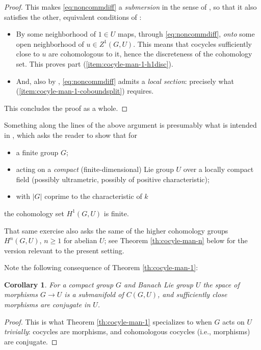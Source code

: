 \documentclass[pdftex]{sigma}
\numberwithin{equation}{section}
\newtheorem{Corollary}[Theorem]{Corollary}
\begin{document}
\begin{proof}
 This makes \eqref{eq:noncommdiff} a {\it submersion} in the sense of \cite[Section~5.9.1\,(i)]{bourb-vars-17}, so that it also satisfies the other, equivalent conditions of \cite[Section~5.9.1]{bourb-vars-17}:
 \begin{itemize}\itemsep=0pt
 \item By \cite[Section~5.9.1\,(iv)]{bourb-vars-17} some neighborhood of $1\in U$ maps, through \eqref{eq:noncommdiff}, {\it onto} some open neighborhood of $u\in Z^1(G,U)$. This means that cocycles sufficiently close to $u$ are cohomologous to it, hence the discreteness of the cohomology set. This proves part (\ref{item:cocyle-man-1-h1disc}).
 \item And, also by \cite[Section~5.9.1\,(iv)]{bourb-vars-17}, \eqref{eq:noncommdiff} admits a {\it local section}: precisely what (\ref{item:cocyle-man-1-coboundsplit}) requires.
 \end{itemize}
 This concludes the proof as a whole.
\end{proof}

\begin{Remark}\label{re:serrex}
 Something along the lines of the above argument is presumably what is intended in \cite[Part II, Chapter IV, Exercise 1]{ser-lag}, which asks the reader to show that for
 \begin{itemize}\itemsep=0pt
 \item a finite group $G$;
 \item acting on a {\it compact} (finite-dimensional) Lie group $U$ over a locally compact field (possibly ultrametric, possibly of positive characteristic);
 \item with $|G|$ coprime to the characteristic of $k$
 \end{itemize}
 the cohomology set $H^1(G,U)$ is finite.

 That same exercise also asks the same of the higher cohomology groups $H^n(G,U)$, $n\ge 1$ for abelian $U$; see Theorem \ref{th:cocyle-man-n} below for the version relevant to the present setting.
\end{Remark}

Note the following consequence of Theorem \ref{th:cocyle-man-1}:

\begin{Corollary}\label{cor:nearbymor}
 For a compact group $G$ and Banach Lie group $U$ the space of morphisms $G\to U$ is a submanifold of $C(G,U)$, and sufficiently close morphisms are conjugate in $U$.
\end{Corollary}
\begin{proof}
 This is what Theorem \ref{th:cocyle-man-1} specializes to when $G$ acts on $U$ {\it trivially}: cocycles are morphisms, and cohomologous cocycles (i.e., morphisms) are conjugate.
\end{proof}
\end{document}
